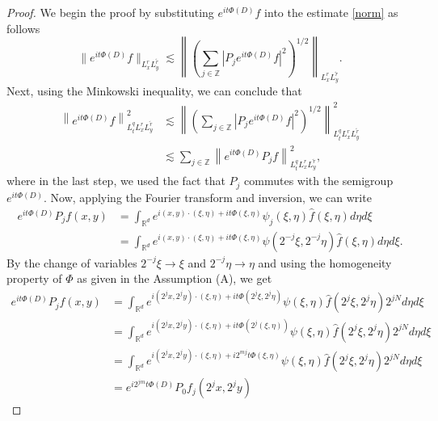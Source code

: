 \documentclass[a4paper,11pt, reqno]{amsart}
\theoremstyle{definition}
\theoremstyle{remark}
\numberwithin{equation}{section}
\begin{document}
	\begin{proof} We begin the proof by substituting $e^{i t\Phi(D)} f$  into the estimate  \eqref{norm} as follows  $$
		\|e^{i t\Phi(D)} f\|_{L_x^r L_y^{\tilde{r}}} \lesssim \left\| \left(\sum_{j \in \mathbb{Z}} \left|P_j e^{i t\Phi(D)} f\right|^2\right)^{1 / 2}\right\|_{L_x^r L_y^{\tilde{r}}}. 
		$$ Next, using the Minkowski inequality, we can  conclude that 
		\begin{align}\label{eq12}\nonumber
			\left\|e^{i t\Phi(D)} f\right\|_{L_t^q L_x^r L_y^{\tilde{r}}}^2 &\lesssim\left\| \left( \sum_{j \in \mathbb{Z}} \left|P_j e^{i t\Phi(D)} f\right|^2\right)^{1 / 2}\right\|_{L_t^q L_x^r L_y^{\tilde{r}}}^2 \\
			& \lesssim \sum_{j \in \mathbb{Z}}\left\|e^{i t\Phi(D)} P_j f\right\|_{L_t^q L_x^r L_y^{\tilde{r}}}^2,
		\end{align}
        where in the last step, we used the fact that  $P_j$  commutes with the semigroup $e^{i t\Phi(D)}$.		Now, applying the Fourier transform and inversion, we can write 
		$$
		\begin{aligned}
			e^{i t\Phi(D)} P_j f(x, y) & = \int_{\mathbb{R}^{d}} e^{i\left(x,  y\right) \cdot(\xi, \eta)+it  \Phi(\xi, \eta)} \psi_j(\xi, \eta) \hat{f}\left( \xi,  \eta\right)   d \eta d \xi \\
			&=  \int_{\mathbb{R}^{d}} e^{i\left(x,  y\right) \cdot(\xi, \eta)+it  \Phi(\xi, \eta)} \psi(2^{-j}\xi, 2^{-j}\eta) \hat{f}\left( \xi,  \eta\right)   d \eta d \xi .
		\end{aligned}
		$$
   By the  change of variables $2^{-j} \xi \rightarrow \xi$ and $2^{-j} \eta \rightarrow \eta$ and using the   homogeneity  property of $\Phi$ as given in the Assumption (A), we get 
		$$
		\begin{aligned}
			e^{i t\Phi(D)} P_j f(x, y) & =  \int_{\mathbb{R}^{d}} e^{i\left(2^jx,  2^jy\right) \cdot(\xi, \eta)+it  \Phi(2^j\xi, 2^j\eta)}  \psi(\xi, \eta) \hat{f}\left( 2^j\xi,  2^j\eta\right)   2^{jN}d \eta d \xi \\
			& =  \int_{\mathbb{R}^{d}} e^{i\left(2^jx,  2^jy\right) \cdot(\xi, \eta)+it  \Phi(2^{j}(\xi, \eta))}  \psi(\xi, \eta) \hat{f}\left( 2^j\xi,  2^j\eta\right)   2^{jN}d \eta d \xi \\
			& =  \int_{\mathbb{R}^{d}} e^{i\left(2^jx,  2^jy\right) \cdot(\xi, \eta)+i2^{mj} t \Phi(\xi, \eta)}  \psi(\xi, \eta) \hat{f}\left( 2^j\xi,  2^j\eta\right)   2^{jN}d \eta d \xi \\
			&
			=e^{i 2^{jm} t\Phi(D)} P_0 f_j\left(2^j x, 2^j y\right)
		\end{aligned}
$$
\end{proof}
\end{document}
